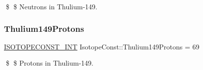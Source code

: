 \$ \$ Neutrons in Thulium-\/149. \mbox{\label{group___isotope_const-_thulium-_tm149_gadd4560893c34e9ddab8895f0b1ef7210}} 
\subsubsection{\texorpdfstring{Thulium149\+Protons}{Thulium149Protons}}
{\footnotesize\ttfamily \mbox{\hyperlink{group___isotope_const-_macros_ga5f18360b3e99483a35c32d789e62621c}{I\+S\+O\+T\+O\+P\+E\+C\+O\+N\+S\+T\+\_\+\+I\+NT}} Isotope\+Const\+::\+Thulium149\+Protons = 69}

\$ \$ Protons in Thulium-\/149. 